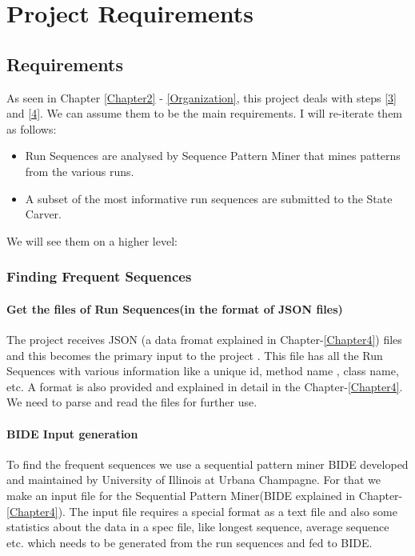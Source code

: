 
\chapter{Project Requirements} %

\label{Chapter3} %



\section{Requirements}
As seen in Chapter \ref{Chapter2} - \ref{Organization}, this project deals with steps \ref{3} and \ref{4}. We can assume them to be the main requirements. I will re-iterate them as follows:

\begin{itemize}
\item Run Sequences are analysed by Sequence Pattern Miner that mines patterns from the various runs.

\item A subset of the most informative run sequences are submitted to the State Carver.
\end{itemize}

We will see them on a higher level:

\subsection{Finding Frequent Sequences}
\subsubsection{Get the files of Run Sequences(in the format of JSON files)}
The project receives JSON (a data fromat explained in Chapter-\ref{Chapter4}) files and this becomes the primary input to the project . This file has all the Run Sequences with various information like a unique id, method name , class name, etc. A format is also provided and explained in detail in the Chapter-\ref{Chapter4}. We need to parse and read the files for further use.
\subsubsection{BIDE Input generation}
To find the frequent sequences we use a sequential pattern miner BIDE developed and maintained by University of Illinois at Urbana Champagne.
For that we make an input file for the Sequential Pattern Miner(BIDE\cite{Wang:2004:BEM:977401.978142} explained in Chapter- \ref{Chapter4}). The input file requires a special format as a text file and also some statistics about the data in a spec file, like longest sequence, average sequence etc. which needs to be generated from the run sequences and fed to BIDE.



